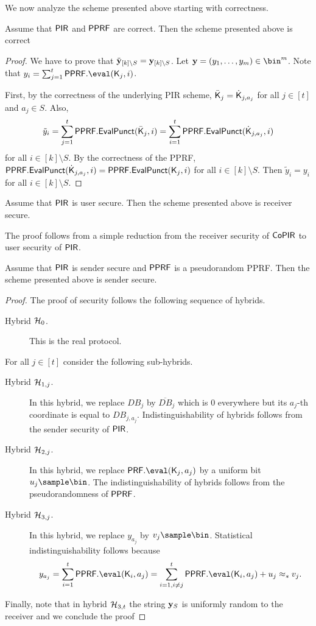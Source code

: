 We now analyze the scheme presented above starting with correctness.

\begin{lemma}[Correctness]
Assume that $\mathsf{PIR}$ and $\mathsf{PPRF}$ are correct. Then the scheme presented above is correct
\end{lemma}
\begin{proof}
We have to prove that $\tilde {\mathbf{y}}_{[k]\setminus S}=\mathbf{y}_{[k]\setminus S}$. Let $\yn=(y_1,\dots ,y_m)\in\bin^m$. Note that $y_i=\sum_{j=1}^t \PPRF.\eval(\key_j,i) $.

First, by the correctness of the underlying PIR scheme, $\bar{\mathsf{K}}_j=\dot{\mathsf{K}}_{j,a_j}$ for all $j\in[t]$ and $a_j\in S$. Also, $$\tilde y_i=\sum_{j=1}^t \mathsf{PPRF}.\mathsf{EvalPunct}(\bar{\mathsf{K}}_j,i)=\sum_{i=1}^t \mathsf{PPRF}.\mathsf{EvalPunct}(\dot {\mathsf{K}}_{j,a_j},i)$$ for all $i\in [k]\setminus S$. By the correctness of the PPRF, $\mathsf{PPRF}.\mathsf{EvalPunct}(\dot {\mathsf{K}}_{j,a_j},i)=\mathsf{PPRF}.\mathsf{EvalPunct}( \mathsf{K}_j,i)$ for all $i \in [k]\setminus S$. Then $\tilde y_i=y_i$ for all $i\in [k]\setminus S$.
\end{proof}


\begin{lemma}
Assume that $\mathsf{PIR}$ is user secure. Then the scheme presented above is receiver secure.
\end{lemma}
The proof follows from a simple reduction from the receiver security of $\mathsf{CoPIR}$ to user security of $\mathsf{PIR}$.



\begin{lemma}
Assume that $\mathsf{PIR}$ is sender secure and $\mathsf{PPRF}$ is a pseudorandom PPRF. Then the scheme presented above is sender secure.
\end{lemma}
\begin{proof}
The proof of security follows the following sequence of hybrids.
\begin{description}
\item[Hybrid $\mathcal{H}_0$.] This is the real protocol.
\end{description}

For all $j\in[t]$ consider the following sub-hybrids.
\begin{description}
\item[Hybrid $\mathcal{H}_{1,j}$.] In this hybrid, we replace ${DB}_j$ by $\overline{DB}_j$ which is $0$ everywhere but its $a_j$-th coordinate is equal to $DB_{j,a_j}$. Indistinguishability of hybrids follows from the sender security of $\mathsf{PIR}$.
\item[Hybrid $\mathcal{H}_{2,j}$.]  In this hybrid, we replace $\PRF.\eval(\key_j,a_j)$ by a uniform bit $u_{j}\sample \bin$. The indistinguishability of hybrids follows from the pseudorandomness of $\mathsf{PPRF}$.
\item[Hybrid $\mathcal{H}_{3,j}$.] In this hybrid, we replace $y_{a_j}$ by $v_j\sample \bin$. Statistical indistinguishability follows because $$y_{a_j}=\sum_{i=1}^t \PPRF.\eval(\key_i,{a_j})=\sum_{i=1,i\neq j}^t \PPRF.\eval(\key_i,{a_j}) + u_{j}\approx_s v_j.$$ 
 \end{description}
 Finally, note that in hybrid $\mathcal{H}_{3,t}$ the string $\mathbf{y}_S$ is uniformly random to the receiver and we conclude the proof 
\end{proof}

